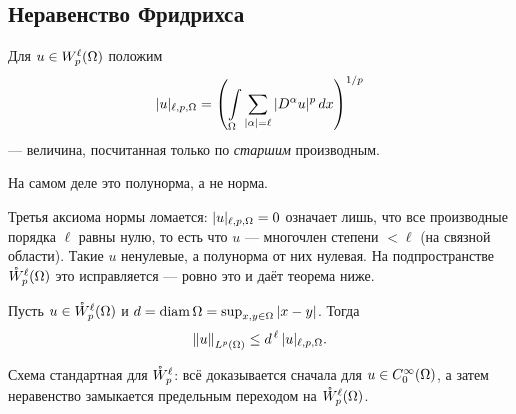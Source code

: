 
\subsection{Неравенство Фридрихса}

\begin{definition}
Для $u \in W_{p}^{\ell}(\Omega)$ положим
\[
  |u|_{\ell,p,\Omega}
  = \left( \int\limits_\Omega \sum_{|\alpha| = \ell} |D^\alpha u|^p\, dx \right)^{1/p}
\]
— величина, посчитанная только по \emph{старшим} производным.
\end{definition}

\begin{remark}
На самом деле это полунорма, а не норма.
\end{remark}

\begin{idea}
Третья аксиома нормы ломается: $|u|_{\ell,p,\Omega} = 0$ означает лишь, что все производные
порядка $\ell$ равны нулю, то есть что $u$ — многочлен степени $< \ell$ (на связной
области). Такие $u$ ненулевые, а полунорма от них нулевая. На подпространстве
$\mathring{W}_{p}^{\ell}(\Omega)$ это исправляется — ровно это и даёт теорема ниже.
\end{idea}

\begin{theorem}\label{thm:friedrichs}
Пусть $u \in \mathring{W}_{p}^{\ell}(\Omega)$ и
$d = \operatorname{diam}\Omega = \sup_{x,y \in \Omega} |x-y|$. Тогда
\[
  \left\lVert u \right\rVert_{L^{p}(\Omega)} \le d^{\,\ell}\, |u|_{\ell,p,\Omega} .
\]
\end{theorem}

\begin{idea}
Схема стандартная для $\mathring{W}_{p}^{\ell}$: всё доказывается сначала для $u \in C_0^\infty(\Omega)$,
а затем неравенство замыкается предельным переходом на $\mathring{W}_{p}^{\ell}(\Omega)$.
\end{idea}

